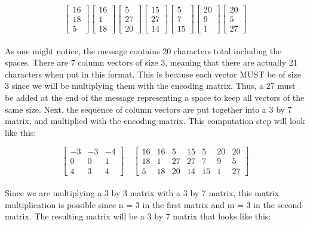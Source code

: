 \documentclass{article}
\begin{document}
$$
\begin{bmatrix}
16\\
18\\
5
\end{bmatrix}
\begin{bmatrix}
16\\
1\\
18
\end{bmatrix}
\begin{bmatrix}
5\\
27\\
20
\end{bmatrix}
\begin{bmatrix}
15\\
27\\
14
\end{bmatrix}
\begin{bmatrix}
5\\
7\\
15
\end{bmatrix}
\begin{bmatrix}
20\\
9\\
1
\end{bmatrix}
\begin{bmatrix}
20\\
5\\
27
\end{bmatrix}
$$ \\

\noindent
As one might notice, the message contains 20 characters total including the spaces. There are 7 column vectors of size 3, meaning that there are actually 21 characters when put in this format. This is because each vector MUST be of size 3 since we will be multiplying them with the encoding matrix. Thus, a 27 must be added at the end of the message representing a space to keep all vectors of the same size. Next, the sequence of column vectors are put together into a 3 by 7 matrix, and multiplied with the encoding matrix. This computation step will look like this:

$$
\begin{bmatrix}
-3 & -3 & -4 \\
0 & 0 & 1 \\
4 & 3 & 4 
\end{bmatrix}
\quad
\begin{bmatrix}
16 & 16 & 5 & 15 & 5 & 20 & 20 \\
18 & 1 & 27 & 27 & 7 & 9 & 5 \\
5 & 18 & 20 & 14 & 15 & 1 & 27
\end{bmatrix}
$$
\\
\noindent
Since we are multiplying a 3 by 3 matrix with a 3 by 7 matrix, this matrix multiplication is possible since n = 3 in the first matrix and m = 3 in the second matrix. The resulting matrix will be a 3 by 7 matrix that looks like this:
\end{document}
